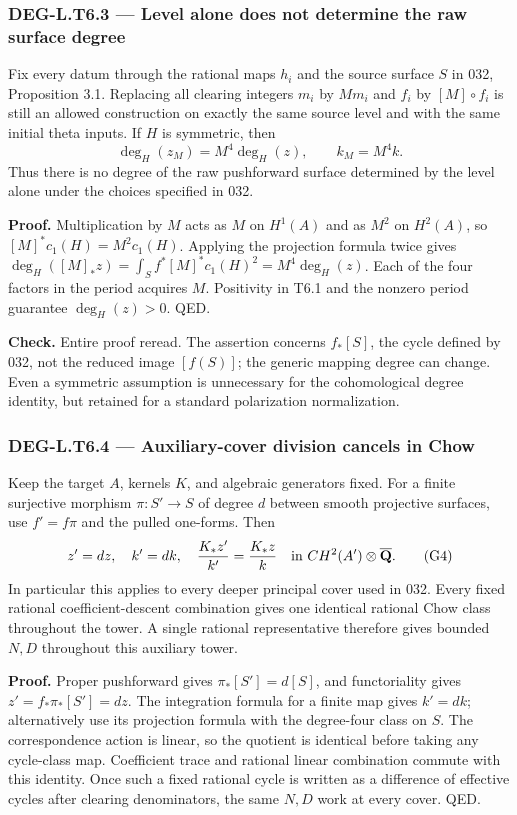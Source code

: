 \subsubsection{DEG-L.T6.3 --- Level alone does not determine the raw surface degree}\label{DEG-L.T6.3}

Fix every datum through the rational maps \(h_i\) and the source surface \(S\) in 032, Proposition 3.1. Replacing all clearing integers \(m_i\) by \(Mm_i\) and \(f_i\) by \([M]\circ f_i\) is still an allowed construction on exactly the same source level and with the same initial theta inputs. If \(H\) is symmetric, then \[
\deg_H(z_M)=M^4\deg_H(z),\qquad k_M=M^4k.
\tag{G3}
\] Thus there is no degree of the raw pushforward surface determined by the level alone under the choices specified in 032.

\textbf{Proof.} Multiplication by \(M\) acts as \(M\) on \(H^1(A)\) and as \(M^2\) on \(H^2(A)\), so \([M]^*c_1(H)=M^2c_1(H)\). Applying the projection formula twice gives \(\deg_H([M]_*z)=\int_S f^*[M]^*c_1(H)^2=M^4\deg_H(z)\). Each of the four factors in the period acquires \(M\). Positivity in T6.1 and the nonzero period guarantee \(\deg_H(z)>0\). QED.

\textbf{Check.} Entire proof reread. The assertion concerns \(f_*[S]\), the cycle defined by 032, not the reduced image \([f(S)]\); the generic mapping degree can change. Even a symmetric assumption is unnecessary for the cohomological degree identity, but retained for a standard polarization normalization.

\subsubsection{DEG-L.T6.4 --- Auxiliary-cover division cancels in Chow}\label{DEG-L.T6.4}

Keep the target \(A\), kernels \(K\), and algebraic generators fixed. For a finite surjective morphism \(\pi:S'\to S\) of degree \(d\) between smooth projective surfaces, use \(f'=f\pi\) and the pulled one-forms. Then \[
z'=d z,\quad k'=d k,\quad {K_*z'\over k'}={K_*z\over k}
\quad\hbox{in }CH^2(A')\otimes\overline{\mathbf Q}.
\tag{G4}
\] In particular this applies to every deeper principal cover used in 032. Every fixed rational coefficient-descent combination gives one identical rational Chow class throughout the tower. A single rational representative therefore gives bounded \(N,D\) throughout this auxiliary tower.

\textbf{Proof.} Proper pushforward gives \(\pi_*[S']=d[S]\), and functoriality gives \(z'=f_*\pi_*[S']=dz\). The integration formula for a finite map gives \(k'=dk\); alternatively use its projection formula with the degree-four class on \(S\). The correspondence action is linear, so the quotient is identical before taking any cycle-class map. Coefficient trace and rational linear combination commute with this identity. Once such a fixed rational cycle is written as a difference of effective cycles after clearing denominators, the same \(N,D\) work at every cover. QED.

